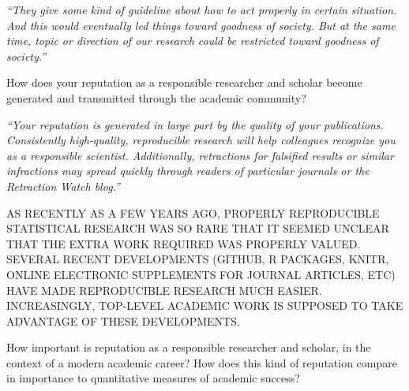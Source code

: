 \documentclass[portrait,11pt]{seminar}
\begin{document}
\medskip

\it ``They give some kind of guideline about how to act properly in certain situation. And this would eventually led things toward goodness of society. But at the same time, topic or direction of our research could be restricted toward goodness of society.''


\es 

%
%
%
%
%

\bs

  How does your reputation as a responsible researcher and scholar become generated and transmitted through the academic community?


\it ``Your reputation is generated in large part by the quality of your publications. Consistently high-quality, reproducible research will help colleagues recognize you as a responsible scientist. Additionally, retractions for falsified results or similar infractions may spread quickly through readers of particular journals or the Retraction Watch blog.''

\medskip

AS RECENTLY AS A FEW YEARS AGO, PROPERLY REPRODUCIBLE STATISTICAL RESEARCH WAS SO RARE THAT IT SEEMED UNCLEAR THAT THE EXTRA WORK REQUIRED WAS PROPERLY VALUED. 
SEVERAL RECENT DEVELOPMENTS (GITHUB, R PACKAGES, KNITR, ONLINE ELECTRONIC SUPPLEMENTS FOR JOURNAL ARTICLES, ETC) HAVE MADE REPRODUCIBLE RESEARCH MUCH EASIER. 
INCREASINGLY, TOP-LEVEL ACADEMIC WORK IS SUPPOSED TO TAKE ADVANTAGE OF THESE DEVELOPMENTS.


\es
\bs

  How important is reputation as a responsible researcher and scholar, in the context of a modern academic career? How does this kind of reputation compare in importance to quantitative measures of academic success?

\end{document}
